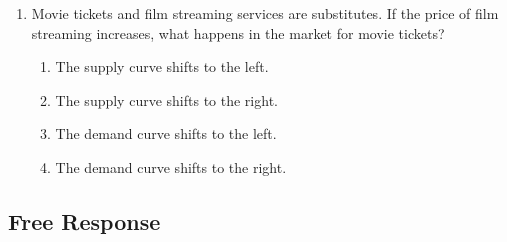 \documentclass{article}
\begin{document}
\begin{enumerate}
\begin{enumerate}
	\end{enumerate}
	
\item Movie tickets and film streaming services are substitutes. If the price of film streaming increases, what happens in the market for movie tickets?

	\begin{enumerate}
	
	\item The supply curve shifts to the left.
	
	\item The supply curve shifts to the right.
	
	\item The demand curve shifts to the left.
	
	\item The demand curve shifts to the right.
	
	\end{enumerate}

\end{enumerate}

\subsection*{Free Response}
\end{document}

